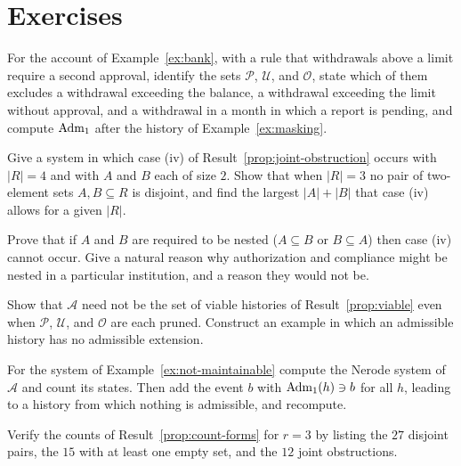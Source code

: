 \section*{Exercises}

\begin{exercise}
For the account of Example~\ref{ex:bank}, with a rule that withdrawals above a limit require a second approval, identify the sets $\mathcal P$, $\mathcal U$, and $\mathcal O$, state which of them excludes a withdrawal exceeding the balance, a withdrawal exceeding the limit without approval, and a withdrawal in a month in which a report is pending, and compute $\operatorname{Adm}_1$ after the history of Example~\ref{ex:masking}.
\end{exercise}

\begin{exercise}
Give a system in which case (iv) of Result~\ref{prop:joint-obstruction} occurs with $|R|=4$ and with $A$ and $B$ each of size $2$. Show that when $|R|=3$ no pair of two-element sets $A,B\subseteq R$ is disjoint, and find the largest $|A|+|B|$ that case (iv) allows for a given $|R|$.
\end{exercise}

\begin{exercise}
Prove that if $A$ and $B$ are required to be nested ($A\subseteq B$ or $B\subseteq A$) then case (iv) cannot occur. Give a natural reason why authorization and compliance might be nested in a particular institution, and a reason they would not be.
\end{exercise}

\begin{exercise}
Show that $\mathcal A$ need not be the set of viable histories of Result~\ref{prop:viable} even when $\mathcal P$, $\mathcal U$, and $\mathcal O$ are each pruned. Construct an example in which an admissible history has no admissible extension.
\end{exercise}

\begin{exercise}
For the system of Example~\ref{ex:not-maintainable} compute the Nerode system of $\mathcal A$ and count its states. Then add the event $b$ with $\operatorname{Adm}_1(h)\ni b$ for all $h$, leading to a history from which nothing is admissible, and recompute.
\end{exercise}


\begin{exercise}
Verify the counts of Result~\ref{prop:count-forms} for $r=3$ by listing the $27$ disjoint pairs, the $15$ with at least one empty set, and the $12$ joint obstructions.\label{ex:count-r3}
\end{exercise}

